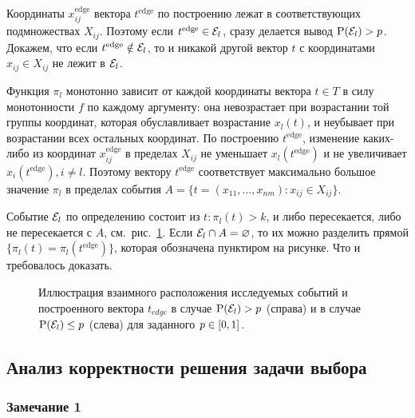 Координаты $x_{ij}^\text{edge}$ вектора $t^\text{edge}$ по построению лежат в соответствующих подмножествах $X_{ij}$. Поэтому если $t^\text{edge} \in \mathcal{E}_l$, сразу делается вывод ${\mathrm{P}}(\mathcal{E}_l) > p$. Докажем, что если $t^\text{edge} \notin \mathcal{E}_l$, то и никакой другой вектор $t$ с координатами $x_{ij} \in X_{ij}$ не лежит в $\mathcal{E}_l$. 

Функция $\pi_l$ монотонно зависит от каждой координаты вектора $t \in T$ в силу монотонности $f$ по каждому аргументу: она невозрастает при возрастании той группы координат, которая обуславливает возрастание $x_l(t)$, и неубывает при возрастании всех остальных координат. По построению $t^\text{edge}$, изменение каких-либо из координат $x_{ij}^\text{edge}$ в пределах $X_{ij}$ не уменьшает $x_l(t^\text{edge})$ и не увеличивает $x_i(t^\text{edge}), i \neq l$. Поэтому вектору $t^\text{edge}$ соответствует максимально большое значение $\pi_l$ в пределах события $A = \{t = (x_{11}, ..., x_{nm}): x_{ij} \in X_{ij}\}$.

Событие $\mathcal{E}_l$ по определению состоит из $t: \pi_l(t) > k$, и либо пересекается, либо не пересекается с $A$, см.~рис.~\ref{ris:algo_sets}. Если $\mathcal{E}_l \cap A = \varnothing$, то их можно разделить прямой $\{\pi_l(t) = \pi_l(t^\text{edge})\}$, которая обозначена пунктиром на рисунке. Что и требовалось доказать.

\begin{figure}[h!]
\caption{\small Иллюстрация взаимного расположения исследуемых событий и построенного вектора $t_{edge}$ в случае ${\mathrm{P}}(\mathcal{E}_l) > p$ (справа) и в случае ${\mathrm{P}}(\mathcal{E}_l) \leq p$ (слева) для заданного $p \in [0,1]$.}
\label{ris:algo_sets}
\end{figure}

\subsection{Анализ корректности решения задачи выбора}
\subsubsection*{Замечание 1}

